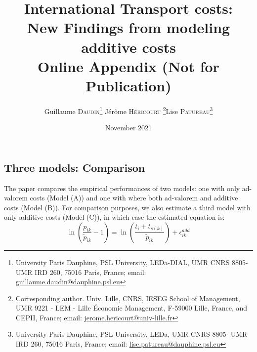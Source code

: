 \documentclass[11pt,twoside, authoryear]{elsarticle}
\begin{document}
\title{\textbf{International Transport costs:\\New Findings from modeling additive costs}\\Online Appendix (Not for Publication)}



\author{Guillaume \textsc{Daudin}\thanks{%
University Paris Dauphine, PSL University, LEDa-DIAL, UMR CNRS 8805-UMR IRD 260, 75016 Paris, France; email: \url{guillaume.daudin@dauphine.psl.eu}}  \qquad J\'{e}r\^{o}me \textsc{H\'{e}ricourt} \thanks{Corresponding author. Univ. Lille, CNRS, IESEG School of Management, UMR 9221 - LEM - Lille Économie Management, F-59000 Lille, France, and CEPII, France; email: \url{jerome.hericourt@univ-lille.fr}}\qquad Lise \textsc{Patureau}\thanks{
University Paris Dauphine, PSL University, LEDa, UMR CNRS 8805- UMR IRD 260, 75016 Paris, France;  email: \url{lise.patureau@dauphine.psl.eu} } }


\date{November 2021}

\maketitle






\tableofcontents
\vspace{1cm}
\newpage
\listoftables
\listoffigures

\newpage



%
%
%
%
%			
%			
%				
%
%

	\renewcommand\thesubsubsection{\Alph{subsection}.\arabic{subsubsection}}
	
	\renewcommand\thesubsection{\Alph{subsection}}
	
	
\subsection{Three models: Comparison \label{secoa:additive_only}}

The paper compares the empirical performances of two models: one with only ad-valorem costs (Model (A)) and one with where both ad-valorem and additive costs (Model (B)).
For comparison purposes, we also estimate a third model with only additive costs (Model (C)), in which case the estimated equation is:
$$\ln\left(\frac{p_{ik}}{\widetilde{p}_{ik}}-1 \right)= \ln \left(\frac{t_{i} + t_{s(k)}}{\widetilde{p}_{ik}}\right) + \epsilon^{add}_{ik}$$
\end{document}
